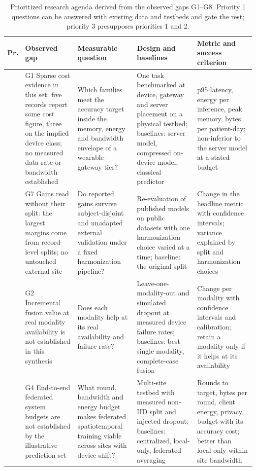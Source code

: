 \documentclass[journal]{IEEEtran}
\begin{document}
\begin{table}[tp]
\centering
\caption{Prioritized research agenda derived from the observed gaps G1--G8. Priority 1 questions can be answered with existing data and testbeds and gate the rest; priority 3 presupposes priorities 1 and 2.}
\label{tab:agenda-a}
\footnotesize
\setlength{\tabcolsep}{2.5pt}
\renewcommand{\arraystretch}{1.12}
\begin{tabularx}{\textwidth}{|>{\raggedright\arraybackslash}p{0.55cm}|>{\raggedright\arraybackslash}p{3.6cm}|>{\raggedright\arraybackslash}p{3.7cm}|X|>{\raggedright\arraybackslash}p{3.6cm}|}
\hline
Pr. & Observed gap & Measurable question & Design and baselines & Metric and success criterion \\
\hline
1 & G1 Sparse cost evidence in this set: five records report some cost figure, three on the implied device class; no measured data rate or bandwidth established & Which families meet the accuracy target inside the memory, energy and bandwidth envelope of a wearable--gateway tier? & One task benchmarked at device, gateway and server placement on a physical testbed; baselines: server model, compressed on-device model, classical predictor & p95 latency, energy per inference, peak memory, bytes per patient-day; non-inferior to the server model at a stated budget \\
\hline
1 & G7 Gains read without their split: the largest margins come from record-level splits; no untouched external site & Do reported gains survive subject-disjoint and unadapted external validation under a fixed harmonization pipeline? & Re-evaluation of published models on public datasets with one harmonization choice varied at a time; baseline: the original split & Change in the headline metric with confidence intervals; variance explained by split and harmonization choices \\
\hline
1 & G2 Incremental fusion value at real modality availability is not established in this synthesis & Does each modality help at its real availability and failure rate? & Leave-one-modality-out and simulated dropout at measured device failure rates; baselines: best single modality, complete-case fusion & Change per modality with confidence intervals and calibration; retain a modality only if it helps at its availability \\
\hline
2 & G4 End-to-end federated system budgets are not established by the illustrative prediction set & What round, bandwidth and energy budget makes federated spatiotemporal training viable across sites with device shift? & Multi-site testbed with measured non-IID split and injected dropout; baselines: centralized, local-only, federated averaging & Rounds to target, bytes per round, client energy, privacy budget with its accuracy cost; better than local-only within site bandwidth \\

\end{tabularx}
\end{table}
\end{document}
